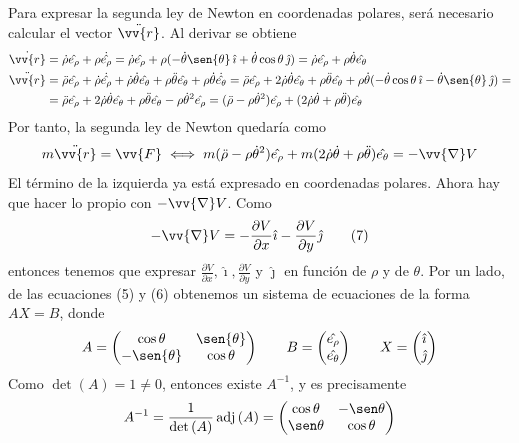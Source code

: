 \documentclass[12pt]{report}
\begin{document}
Para expresar la segunda ley de Newton en coordenadas polares, será necesario calcular el vector $\ddot{\vv{r}}$. Al derivar se obtiene
\[
\begin{aligned}[t]
\dot{\vv{r}} &= \dot{\rho}\hat{e_\rho}+\rho\dot{\hat{e_\rho}} = \dot{\rho}\hat{e_\rho}+\rho(-\dot{\theta}\sen{\theta} \, \hat{\imath}+\dot{\theta}\cos{\theta} \, \hat{\jmath}) = \dot{\rho}\hat{e_\rho}+\rho\dot{\theta}\hat{e_\theta} \\
\ddot{\vv{r}} &= \ddot{\rho}\hat{e_\rho}+\dot{\rho}\dot{\hat{e_\rho}}+\dot{\rho}\dot{\theta}\hat{e_\theta}+\rho\ddot{\theta}\hat{e_\theta}+\rho\dot{\theta}\dot{\hat{e_\theta}} = \ddot{\rho}\hat{e_\rho}+2\dot{\rho}\dot{\theta}\hat{e_\theta} +\rho\ddot{\theta}\hat{e_\theta}+\rho\dot{\theta}(-\dot{\theta}\cos{\theta} \, \hat{\imath}-\dot{\theta}\sen{\theta} \, \hat{\jmath}) = \\
&= \ddot{\rho}\hat{e_\rho}+2\dot{\rho}\dot{\theta}\hat{e_\theta}+\rho\ddot{\theta}\hat{e_\theta}-\rho\dot{\theta}^2\hat{e_\rho} = (\ddot{\rho}-\rho\dot{\theta}^2)\hat{e_\rho}+(2\dot{\rho}\dot{\theta}+\rho\ddot{\theta})\hat{e_\theta}
\end{aligned}
\]
Por tanto, la segunda ley de Newton quedaría como
\[m\ddot{\vv{r}} = \vv{F} \iff m(\ddot{\rho}-\rho\dot{\theta}^2)\hat{e_\rho}+m(2\dot{\rho}\dot{\theta}+\rho\ddot{\theta})\hat{e_\theta} = -\vv{\nabla}V\]
El término de la izquierda ya está expresado en coordenadas polares. Ahora hay que hacer lo propio con $-\vv{\nabla}V$. Como
\[-\vv{\nabla}V = -\frac{\partial V}{\partial x}\hat{\imath}-\frac{\partial V}{\partial y}\hat{\jmath} \tag{7}\]
entonces tenemos que expresar $\frac{\partial V}{\partial x},\hat{\imath},\frac{\partial V}{\partial y}$ y $\hat{\jmath}$ en función de $\rho$ y de $\theta$. Por un lado, de las ecuaciones (5) y (6) obtenemos un sistema de ecuaciones de la forma $AX = B$, donde
\[
A = \begin{pmatrix}
\cos{\theta} & \sen{\theta} \\
-\sen{\theta} & \cos{\theta}
\end{pmatrix}
\qquad
B = \begin{pmatrix}
\hat{e_\rho} \\
\hat{e_\theta}
\end{pmatrix}
\qquad
X = \begin{pmatrix}
\hat{\imath} \\
\hat{\jmath}
\end{pmatrix}
\]
Como $\det{(A)}=1 \neq 0$, entonces existe $A^{-1}$, y es precisamente
\[
A^{-1}=\frac{1}{\det{(A)}}\, \mathrm{adj} \, (A) = \begin{pmatrix}
    \cos\theta & -\sen\theta \\
    \sen\theta & \cos\theta
\end{pmatrix}
\]
\end{document}
